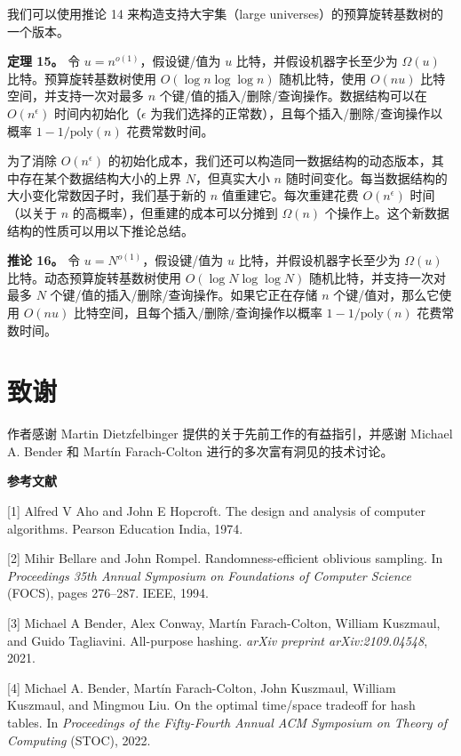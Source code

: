 \documentclass[12pt,a4paper]{ctexart}
\theoremstyle{remark}
\begin{document}
我们可以使用推论 14 来构造支持大宇集（large universes）的预算旋转基数树的一个版本。

\textbf{定理 15。} 令 $u=n^{o(1)}$，假设键/值为 $u$ 比特，并假设机器字长至少为 $\Omega(u)$ 比特。预算旋转基数树使用 $O(\log n\log\log n)$ 随机比特，使用 $O(nu)$ 比特空间，并支持一次对最多 $n$ 个键/值的插入/删除/查询操作。数据结构可以在 $O(n^{\epsilon})$ 时间内初始化（$\epsilon$ 为我们选择的正常数），且每个插入/删除/查询操作以概率 $1-1/\text{poly}(n)$ 花费常数时间。

为了消除 $O(n^{\epsilon})$ 的初始化成本，我们还可以构造同一数据结构的动态版本，其中存在某个数据结构大小的上界 $N$，但真实大小 $n$ 随时间变化。每当数据结构的大小变化常数因子时，我们基于新的 $n$ 值重建它。每次重建花费 $O(n^{\epsilon})$ 时间（以关于 $n$ 的高概率），但重建的成本可以分摊到 $\Omega(n)$ 个操作上。这个新数据结构的性质可以用以下推论总结。

\textbf{推论 16。} 令 $u=N^{o(1)}$，假设键/值为 $u$ 比特，并假设机器字长至少为 $\Omega(u)$ 比特。动态预算旋转基数树使用 $O(\log N\log\log N)$ 随机比特，并支持一次对最多 $N$ 个键/值的插入/删除/查询操作。如果它正在存储 $n$ 个键/值对，那么它使用 $O(nu)$ 比特空间，且每个插入/删除/查询操作以概率 $1-1/\text{poly}(n)$ 花费常数时间。

\medskip
\section{致谢}
作者感谢 Martin Dietzfelbinger 提供的关于先前工作的有益指引，并感谢 Michael A. Bender 和 Martín Farach-Colton 进行的多次富有洞见的技术讨论。

\medskip
\textbf{参考文献}

[1] Alfred V Aho and John E Hopcroft. The design and analysis of computer algorithms. Pearson Education India, 1974.

[2] Mihir Bellare and John Rompel. Randomness-efficient oblivious sampling. In \textit{Proceedings 35th Annual Symposium on Foundations of Computer Science} (FOCS), pages 276--287. IEEE, 1994.

[3] Michael A Bender, Alex Conway, Martín Farach-Colton, William Kuszmaul, and Guido Tagliavini. All-purpose hashing. \textit{arXiv preprint arXiv:2109.04548}, 2021.

[4] Michael A. Bender, Martín Farach-Colton, John Kuszmaul, William Kuszmaul, and Mingmou Liu. On the optimal time/space tradeoff for hash tables. In \textit{Proceedings of the Fifty-Fourth Annual ACM Symposium on Theory of Computing} (STOC), 2022.
\end{document}

